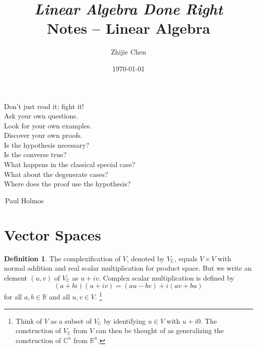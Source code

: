 \documentclass{tufte-handout}
\title{	
	\normalfont\normalsize 
	{\itshape Linear Algebra Done Right} \\ [0pt]
	\huge Notes -- Linear Algebra
}
\author{Zhijie Chen}
\date{\vspace{-5pt}\normalsize\today}
\theoremstyle{plain} %
\theoremstyle{definition}
\newtheorem{defn}[thm]{Definition}
\newtheorem{notns}[thm]{Notations}
\theoremstyle{remark}
\newcommand{\R}{\mathbb{R}}
\newcommand{\C}{\mathbb{C}}
\newcommand{\F}{\mathbb{F}}
\begin{document}
\justifying
\maketitle
\tableofcontents
\newpage

\thispagestyle{empty}
\begin{fullwidth}
	\vspace*{\fill}
	\begin{center}
		\LARGE
		Don't just read it; fight it!\\
		Ask your own questions.\\
		Look for your own examples.\\
		Discover your own proofs.\\
		Is the hypothesis necessary?\\
		Is the converse true?\\
		What happens in the classical special case?\\
		What about the degenerate cases?\\
		Where does the proof use the hypothesis?
	\end{center}
	\begin{flushright}
		\LARGE
		\textemdash\,Paul Holmos\phantom{placeholderrrrrr}
	\end{flushright}
	\vspace*{\fill}
\end{fullwidth}
\newpage





\section{Vector Spaces}
\begin{defn}
	The complexification of $V$, denoted by $V_\C$, equals $V\times V$ with normal addition and real scalar multiplication for product space. But we write an element $(u,v)$ of $V_\C$ as $u+iv$. Complex scalar multiplication is defined by
	\[(a+bi)(u+iv)=(au-bv)+i(av+bu)\]
	for all $a,b\in\R$ and all $u,v\in V$.%
	\footnote{Think of $V$ as a subset of $V_\C$ by identifying $u\in V$ with $u+i0$. The construction of $V_\C$ from $V$ can then be thought of as generalizing the construction of $\C^n$ from $\R^n$.}
\end{defn}
\end{document}
